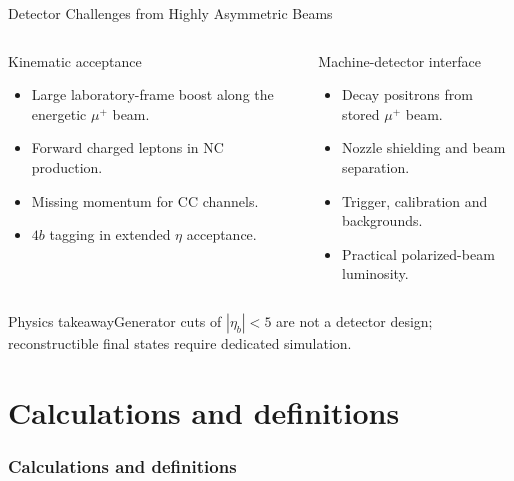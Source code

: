 \documentclass[aspectratio=1610,english]{beamer}
\newcommand{\src}[1]{\vfill{\par\color{black!65}\fontsize{6.4}{7.4}\selectfont\emph{Source:} #1\par}}
\newcommand{\key}[1]{\begin{alertblock}{Physics takeaway}\small  #1\end{alertblock}}
\begin{document}
\begin{frame}[t]{Detector Challenges from Highly Asymmetric Beams}
\small

\begin{columns}%
\begin{block}{Kinematic acceptance}
\begin{itemize}
\justifying
\item Large laboratory-frame boost along the energetic $\mu^+$ beam.
\item Forward charged leptons in NC production.
\item Missing momentum for CC channels.
\item $4b$ tagging in extended $\eta$ acceptance.
\end{itemize}\end{block}
\begin{block}{Machine-detector interface}
\begin{itemize}
\justifying
\item Decay positrons from stored $\mu^+$ beam.
\item Nozzle shielding and beam separation.
\item Trigger, calibration and backgrounds.
\item Practical polarized-beam luminosity.
\end{itemize}\end{block}
\end{columns}

\key{Generator cuts of $|\eta_b|<5$ are not a detector design; reconstructible final states require dedicated simulation.}

\end{frame}




\part{Calculations and definitions}
\section{Calculations and definitions}
\end{document}
